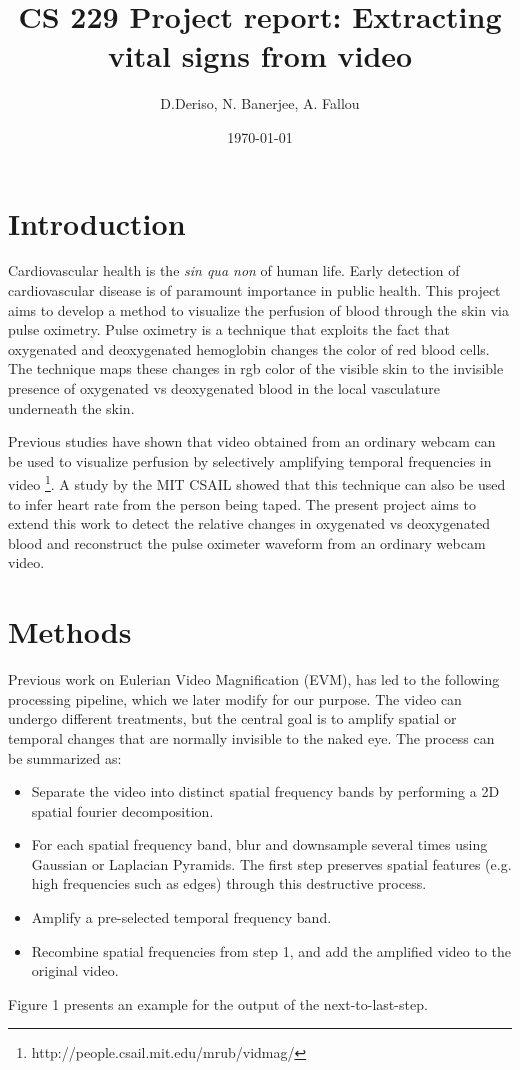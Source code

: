 \documentclass[12pt]{article}
\begin{document}
  \title{CS 229 Project report: Extracting vital signs from video}
  \author{D.Deriso, N. Banerjee, A. Fallou}
  \date{\today}
  \maketitle
  \thispagestyle{empty}



\section*{Introduction}
%
\small  
Cardiovascular health is the \emph{sin qua non} of human life. Early detection of cardiovascular disease is of paramount importance in public health. This project aims to develop a method to visualize the perfusion of blood through the skin via pulse oximetry. Pulse oximetry is a technique that exploits the fact that oxygenated and deoxygenated hemoglobin changes the color of red blood cells. The technique maps these changes in rgb color of the visible skin to the invisible presence of oxygenated vs deoxygenated blood in the local vasculature underneath the skin.

Previous studies have shown that video obtained from an ordinary webcam can be used to visualize perfusion by selectively amplifying temporal frequencies in video \footnote{http://people.csail.mit.edu/mrub/vidmag/}. A study by the MIT CSAIL showed that this technique can also be used to infer heart rate from the person being taped. The present project aims to extend this work to detect the relative changes in oxygenated vs deoxygenated blood and reconstruct the pulse oximeter waveform from an ordinary webcam video.



\section{Methods}

Previous work on Eulerian Video Magnification (EVM), has led to the following processing pipeline, which we later modify for our purpose. The video can undergo different treatments, but the central goal is to amplify spatial or temporal changes that are normally invisible to the naked eye. The process can be summarized as:

\begin{itemize}
\item Separate the video into distinct spatial frequency bands by performing a 2D spatial fourier decomposition. 
\item For each spatial frequency band, blur and downsample several times using Gaussian or Laplacian Pyramids. The first step preserves spatial features (e.g. high frequencies such as edges) through this destructive process.
\item Amplify a pre-selected temporal frequency band.
\item Recombine spatial frequencies from step 1, and add the amplified video to the original video.
\end{itemize}
Figure 1 presents an example for the output of the next-to-last-step. 
\end{document}
